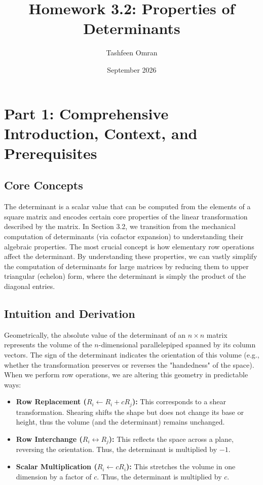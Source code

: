 \documentclass{article}
\title{Homework 3.2: Properties of Determinants}
\author{Tashfeen Omran}
\date{September 2026}
\begin{document}
\maketitle
\tableofcontents
\newpage

\section{Part 1: Comprehensive Introduction, Context, and Prerequisites}

\subsection{Core Concepts}
The determinant is a scalar value that can be computed from the elements of a square matrix and encodes certain core properties of the linear transformation described by the matrix. In Section 3.2, we transition from the mechanical computation of determinants (via cofactor expansion) to understanding their algebraic properties. The most crucial concept is how elementary row operations affect the determinant. By understanding these properties, we can vastly simplify the computation of determinants for large matrices by reducing them to upper triangular (echelon) form, where the determinant is simply the product of the diagonal entries.

\subsection{Intuition and Derivation}
Geometrically, the absolute value of the determinant of an $n \times n$ matrix represents the volume of the $n$-dimensional parallelepiped spanned by its column vectors. The sign of the determinant indicates the orientation of this volume (e.g., whether the transformation preserves or reverses the "handedness" of the space). 
When we perform row operations, we are altering this geometry in predictable ways:
\begin{itemize}
    \item \textbf{Row Replacement ($R_i \leftarrow R_i + cR_j$):} This corresponds to a shear transformation. Shearing shifts the shape but does not change its base or height, thus the volume (and the determinant) remains unchanged.
    \item \textbf{Row Interchange ($R_i \leftrightarrow R_j$):} This reflects the space across a plane, reversing the orientation. Thus, the determinant is multiplied by $-1$.
    \item \textbf{Scalar Multiplication ($R_i \leftarrow cR_i$):} This stretches the volume in one dimension by a factor of $c$. Thus, the determinant is multiplied by $c$.
\end{itemize}
\end{document}

